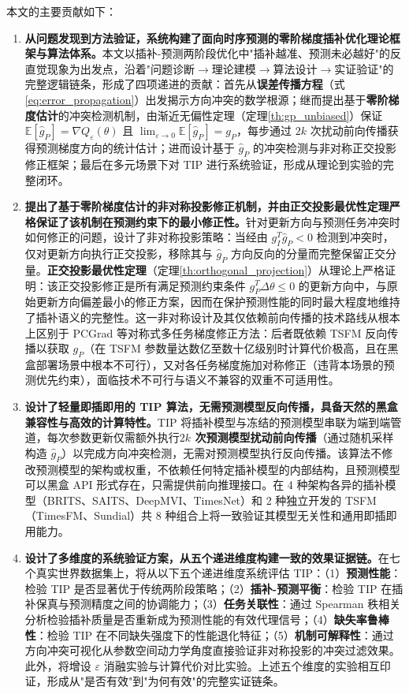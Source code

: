 \documentclass{article}
\begin{document}
本文的主要贡献如下：
\begin{enumerate}
	\item \textbf{从问题发现到方法验证，系统构建了面向时序预测的零阶梯度插补优化理论框架与算法体系。}本文以插补-预测两阶段优化中"插补越准、预测未必越好"的反直觉现象为出发点，沿着"问题诊断$\to$理论建模$\to$算法设计$\to$实证验证"的完整逻辑链条，形成了四项递进的贡献：首先从\textbf{误差传播方程}（式\ref{eq:error_propagation}）出发揭示方向冲突的数学根源；继而提出基于\textbf{零阶梯度估计}的冲突检测机制，由渐近无偏性定理（定理\ref{th:gp_unbiased}）保证 $\mathbb{E}[\hat{g}_P] = \nabla Q_\varepsilon(\theta)$ 且 $\lim_{\varepsilon\to 0}\mathbb{E}[\hat{g}_P] = g_P$，每步通过 $2k$ 次扰动前向传播获得预测梯度方向的统计估计；进而设计基于 $\hat{g}_P$ 的冲突检测与非对称正交投影修正框架；最后在多元场景下对 TIP 进行系统验证，形成从理论到实验的完整闭环。
    \item \textbf{提出了基于零阶梯度估计的非对称投影修正机制，并由正交投影最优性定理严格保证了该机制在预测约束下的最小修正性。}针对更新方向与预测任务冲突时如何修正的问题，设计了非对称投影策略：当经由 $g_I^T\hat{g}_P < 0$ 检测到冲突时，仅对更新方向执行正交投影，移除其与 $\hat{g}_P$ 方向反向的分量而完整保留正交分量。\textbf{正交投影最优性定理}（定理\ref{th:orthogonal_projection}）从理论上严格证明：该正交投影修正是所有满足预测约束条件 $g_P^T\Delta\theta \leq 0$ 的更新方向中，与原始更新方向偏差最小的修正方案，因而在保护预测性能的同时最大程度地维持了插补语义的完整性。这一非对称设计及其仅依赖前向传播的技术路线从根本上区别于 PCGrad 等对称式多任务梯度修正方法：后者既依赖 TSFM 反向传播以获取 $g_P$（在 TSFM 参数量达数亿至数十亿级别时计算代价极高，且在黑盒部署场景中根本不可行），又对各任务梯度施加对称修正（违背本场景的预测优先约束），面临技术不可行与语义不兼容的双重不可适用性。
    \item \textbf{设计了轻量即插即用的 TIP 算法，无需预测模型反向传播，具备天然的黑盒兼容性与高效的计算特性。}TIP 将插补模型与冻结的预测模型串联为端到端管道，每次参数更新仅需额外执行\textbf{$2k$ 次预测模型扰动前向传播}（通过随机采样构造 $\hat{g}_P$）以完成方向冲突检测，无需对预测模型执行反向传播。该算法不修改预测模型的架构或权重，不依赖任何特定插补模型的内部结构，且预测模型可以黑盒 API 形式存在，只需提供前向推理接口。在 4 种架构各异的插补模型（BRITS、SAITS、DeepMVI、TimesNet）和 2 种独立开发的 TSFM（TimesFM、Sundial）共 8 种组合上将一致验证其模型无关性和通用即插即用能力。
    \item \textbf{设计了多维度的系统验证方案，从五个递进维度构建一致的效果证据链。}在七个真实世界数据集上，将从以下五个递进维度系统评估 TIP：（1）\textbf{预测性能}：检验 TIP 是否显著优于传统两阶段策略；（2）\textbf{插补-预测平衡}：检验 TIP 在插补保真与预测精度之间的协调能力；（3）\textbf{任务关联性}：通过 Spearman 秩相关分析检验插补质量是否重新成为预测性能的有效代理信号；（4）\textbf{缺失率鲁棒性}：检验 TIP 在不同缺失强度下的性能退化特征；（5）\textbf{机制可解释性}：通过方向冲突可视化从参数空间动力学角度直接验证非对称投影的冲突过滤效果。此外，将增设 $\varepsilon$ 消融实验与计算代价对比实验。上述五个维度的实验相互印证，形成从"是否有效"到"为何有效"的完整实证链条。
\end{enumerate}
\end{document}

